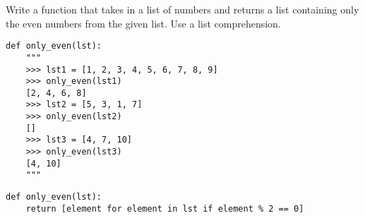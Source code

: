 \begin{blocksection}
\question Write a function that takes in a list of numbers and returns a list containing only the even numbers from the given list. Use a list comprehension.

\begin{lstlisting}
def only_even(lst): 
    """
    >>> lst1 = [1, 2, 3, 4, 5, 6, 7, 8, 9]
    >>> only_even(lst1)
    [2, 4, 6, 8]
    >>> lst2 = [5, 3, 1, 7]
    >>> only_even(lst2)
    []
    >>> lst3 = [4, 7, 10]
    >>> only_even(lst3)
    [4, 10]
    """

\end{lstlisting}

\begin{solution}[1.5in]
\begin{lstlisting}
def only_even(lst):
    return [element for element in lst if element % 2 == 0]
\end{lstlisting}
\end{solution}
\end{blocksection}
